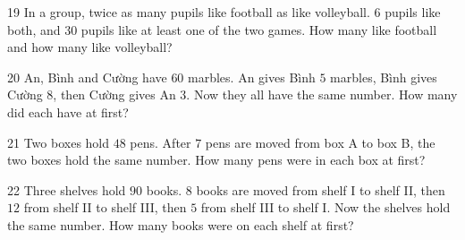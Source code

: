 \gap
\begin{probbox}{19}{\relax}
In a group, twice as many pupils like football as like volleyball. $6$ pupils like both, and $30$ pupils like at least one of the two games. How many like football and how many like volleyball?
\end{probbox}
\gap
\begin{probbox}{20}{\relax}
An, Bình and Cường have $60$ marbles. An gives Bình $5$ marbles, Bình gives Cường $8$, then Cường gives An $3$. Now they all have the same number. How many did each have at first?
\end{probbox}
\gap
\begin{probbox}{21}{\relax}
Two boxes hold $48$ pens. After $7$ pens are moved from box A to box B, the two boxes hold the same number. How many pens were in each box at first?
\end{probbox}
\gap
\begin{probbox}{22}{\relax}
Three shelves hold $90$ books. $8$ books are moved from shelf I to shelf II, then $12$ from shelf II to shelf III, then $5$ from shelf III to shelf I. Now the shelves hold the same number. How many books were on each shelf at first?
\end{probbox}
